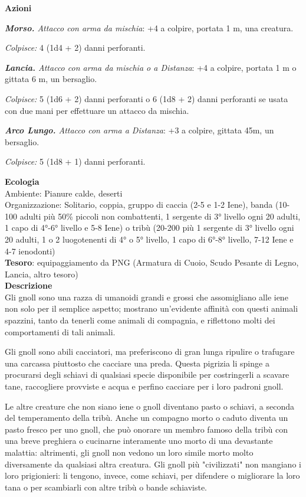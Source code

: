 \begin{multicols}{2}
	\textbf{Azioni}

	\textit{\textbf{Morso.} Attacco con arma da mischia}: +4 a colpire, portata 1 m, una creatura.

	\textit{Colpisce:} 4 (1d4 + 2) danni perforanti.

	\textit{\textbf{Lancia.} Attacco con arma da mischia o a Distanza}: +4 a colpire, portata 1 m o gittata 6 m, un bersaglio.

	\textit{Colpisce:} 5 (1d6 + 2) danni perforanti o 6 (1d8 + 2) danni perforanti se usata con due mani per effettuare un attacco da mischia.

	\textit{\textbf{Arco Lungo.} Attacco con arma a Distanza}: +3 a colpire, gittata 45m, un bersaglio.

	\textit{Colpisce:} 5 (1d8 + 1) danni perforanti.

	\textbf{Ecologia}\\
	Ambiente: Pianure calde, deserti\\
	Organizzazione: Solitario, coppia, gruppo di caccia (2-5 e 1-2 Iene), banda (10-100 adulti più 50\% piccoli non combattenti, 1 sergente di 3° livello ogni 20 adulti, 1 capo di 4°-6° livello e 5-8 Iene) o tribù (20-200 più 1 sergente di 3° livello ogni 20 adulti, 1 o 2 luogotenenti di 4° o 5° livello, 1 capo di 6°-8° livello, 7-12 Iene e 4-7 ienodonti)\\
	\textbf{Tesoro}: equipaggiamento da PNG (Armatura di Cuoio, Scudo Pesante di Legno, Lancia, altro tesoro)\\
	\textbf{Descrizione}\\
	Gli gnoll sono una razza di umanoidi grandi e grossi che assomigliano alle iene non solo per il semplice aspetto; mostrano un'evidente affinità con questi animali spazzini, tanto da tenerli come animali di compagnia, e riflettono molti dei comportamenti di tali animali.

	Gli gnoll sono abili cacciatori, ma preferiscono di gran lunga ripulire o trafugare una carcassa piuttosto che cacciare una preda. Questa pigrizia li spinge a procurarsi degli schiavi di qualsiasi specie disponibile per costringerli a scavare tane, raccogliere provviste e acqua e perfino cacciare per i loro padroni gnoll.

	Le altre creature che non siano iene o gnoll diventano pasto o schiavi, a seconda del temperamento della tribù. Anche un compagno morto o caduto diventa un pasto fresco per uno gnoll, che può onorare un membro famoso della tribù con una breve preghiera o cucinarne interamente uno morto di una devastante malattia: altrimenti, gli gnoll non vedono un loro simile morto molto diversamente da qualsiasi altra creatura. Gli gnoll più "civilizzati" non mangiano i loro prigionieri: li tengono, invece, come schiavi, per difendere o migliorare la loro tana o per scambiarli con altre tribù o bande schiaviste.


\end{multicols}

